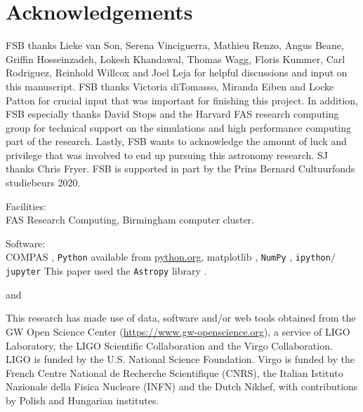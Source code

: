 \documentclass[twocolumn]{aastex63}
\begin{document}
\section*{Acknowledgements}
%
FSB thanks Lieke van Son, Serena Vinciguerra, Mathieu Renzo,  Angus Beane, Griffin Hosseinzadeh,  Lokesh Khandawal, Thomas Wagg, Floris Kummer,  Carl Rodriguez, Reinhold Willcox and Joel Leja for helpful discussions and input on this manuscript. FSB thanks Victoria diTomasso, Miranda Eiben and Locke Patton for crucial input that was important  for finishing this project.  In addition, FSB  especially thanks David Stops and the Harvard FAS research computing group for technical support on the simulations and high performance computing part of the research.   Lastly, FSB wants to acknowledge the  amount of luck and privilege that was involved to end up pursuing this astronomy research. 
SJ thanks Chris Fryer. FSB is supported in part by the Prins Bernard Cultuurfonds studiebeurs 2020. 

Facilities: \\ 
FAS Research Computing, Birmingham computer cluster. 

Software: \\
\textsc{COMPAS}  \citep{stevenson2017formation, 2018MNRAS.477.4685B, 2018MNRAS.481.4009V},   \texttt{Python} available from \url{python.org}, matplotlib \citep{2007CSE.....9...90H},  \texttt{NumPy} \citep{2011CSE....13b..22V}, \texttt{ipython$/$jupyter} \citep{2007CSE.....9c..21P, kluyver2016jupyter} This paper used the \texttt{Astropy} library \citep{2018AJ....156..123A}.

 {} and  {}

%


This research has made use of data, software and/or web tools obtained from the \ac{GW} Open Science Center (\url{https://www.gw-openscience.org}), a service of LIGO Laboratory, the LIGO Scientific Collaboration and the Virgo Collaboration. LIGO is funded by the U.S. National Science Foundation. Virgo is funded by the French Centre National de Recherche Scientifique (CNRS), the Italian Istituto Nazionale della Fisica Nucleare (INFN) and the Dutch Nikhef, with contributions by Polish and Hungarian institutes.
%
%
\end{document}
